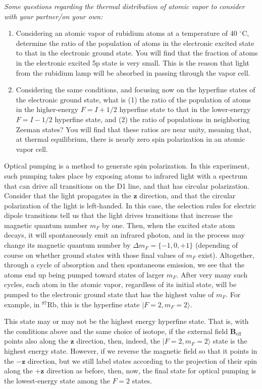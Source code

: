 \documentclass{../lab}
\begin{document}
\emph{Some questions regarding the thermal distribution of atomic vapor to consider with your partner/on your own:}
\begin{enumerate}[resume=forstudents,label=Q\arabic*.]%
    \item  Considering an atomic vapor of rubidium atoms at a temperature of 40 $^\circ$C, determine the ratio of the population of atoms in the electronic excited state to that in the electronic ground state.  You will find that the fraction of atoms in the electronic excited 5p state is very small. This is the reason that light from the rubidium lamp will be absorbed in passing through the vapor cell.
    \item Considering the same conditions, and focusing now on the hyperfine states of the electronic ground state, what is (1) the ratio of the population of atoms in the higher-energy $F = I+1/2$ hyperfine state to that in the lower-energy $F= I-1/2$ hyperfine state, and (2) the ratio of populations in neighboring Zeeman states?  You will find that these ratios are near unity, meaning that, at thermal equilibrium, there is nearly zero spin polarization in an atomic vapor cell.
\end{enumerate}

Optical pumping is a method to generate spin polarization.  In this experiment, such pumping takes place by exposing atoms to infrared light with a spectrum that can drive all transitions on the D1 line, and that has circular polarization.  Consider that the light propagates in the $\mathbf{z}$ direction, and that the circular polarization of the light is left-handed.  In this case, the selection rules for electric dipole transitions tell us that the light drives transitions that increase the magnetic quantum number $m_F$ by one.  Then, when the excited state atom decays, it will spontaneously emit an infrared photon, and in the process may change its magnetic quantum number by $\Delta m_F = \{-1, 0, +1\}$ (depending of course on whether ground states with those final values of $m_F$ exist).  Altogether, through a cycle of absorption and then spontaneous emission, we see that the atoms end up being pumped toward states of larger $m_F$.  After very many such cycles, each atom in the atomic vapor, regardless of its initial state, will be pumped to the electronic ground state that has the highest value of $m_F$.  For example, in $^{87}$Rb, this is the hyperfine state $|F=2, m_F = 2\rangle$.

This state may or may not be the highest energy hyperfine state. That is, with the conditions above and the same choice of isotope, if the external field $\mathbf{B}_\mathrm{eff}$ points also along the $\mathbf{z}$ direction, then, indeed, the $|F=2, m_F = 2\rangle$ state is the highest energy state.  However, if we reverse the magnetic field so that it points in the $-\mathbf{z}$ direction, but we still label states according to the projection of their spin along the $+\mathbf{z}$ direction as before, then, now, the final state for optical pumping is the lowest-energy state among the $F=2$ states.
\end{document}
